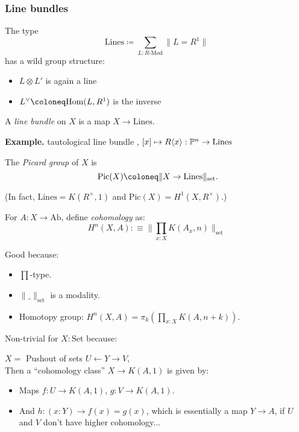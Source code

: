 \documentclass{beamer}
\begin{document}
\begin{frame}
  \frametitle{Line bundles}

  The type
  \[ \mathrm{Lines} \coloneq \sum_{L : R\text{-Mod}} \lVert L = R^1 \rVert \]
  has a wild group structure:
  \begin{itemize}
    \item
      $L \otimes L'$ is again a line
    \item
      $L^{\vee} \coloneq \Hom(L, R^1)$ is the inverse
  \end{itemize}

  \pause
  \vspace{5mm}
  A \emph{line bundle} on $X$ is a map $X \to \mathrm{Lines}$.

  \textbf{Example.}
  tautological line bundle , $[x]\mapsto R\langle x \rangle:\mathbb{P}^n\to \mathrm{Lines}$ 

  \pause
  \vspace{5mm}
  The \emph{Picard group} of $X$ is
  \[ \mathrm{Pic}(X) \coloneq \lVert X \to \mathrm{Lines} \rVert_{\text{set}} \rlap{.}\]

  \vspace{5mm}
  (In fact, $\mathrm{Lines} = K(R^{\times}, 1)$
  and $\mathrm{Pic}(X) = H^1(X, R^{\times})$.)
\end{frame}

\begin{frame}
  \vspace{0.25cm}
  For $A : X \to \mathrm{Ab}$, define \emph{cohomology} as:
  \[ H^n(X, A) :\equiv \Big\| \prod_{x:X}K(A_x,n) \Big\|_{\mathrm{set}} \]
  
  \pause
  Good because:
  \begin{itemize}
  \item $\prod$-type.
  \item $\|\_\|_{\mathrm{set}}$ is a modality.
  \item Homotopy group: $H^n(X,A)=\pi_{k}(\prod_{x:X}K(A,n+k))$.
  \end{itemize}

  \pause
  Non-trivial for $X:\mathrm{Set}$ because:

  $X=$ Pushout of sets $U\leftarrow Y\to V$, \\
  Then a ``cohomology class'' $X\to K(A,1)$ is given by:
  \begin{itemize}
  \item Maps $f:U\to K(A,1)$, $g:V\to K(A,1)$.
  \item And $h:(x:Y)\to f(x)=g(x)$, which is essentially a map $Y\to A$,
    if $U$ and $V$ don't have higher cohomology...
  \end{itemize}
\end{frame}
\end{document}
